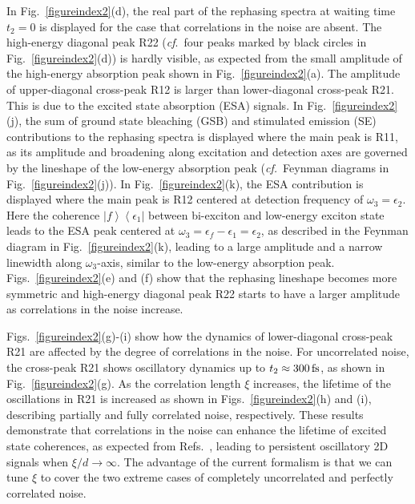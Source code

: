 \documentclass[%
 reprint,%
 amssymb, amsmath,%
 aip,cha,%
]{revtex4-1}
\newcommand{\bra}[1]{\ensuremath{\left\langle{#1}\right\vert}}
\newcommand{\ket}[1]{\ensuremath{\left|{#1}\right\rangle}}
\begin{document}
In Fig.~\ref{figureindex2}(d), the real part of the rephasing spectra at waiting time $t_2=0$ is displayed for the case that correlations in the noise are absent. The high-energy diagonal peak R22 ({\it cf}.~four peaks marked by black circles in Fig.~\ref{figureindex2}(d)) is hardly visible, as expected from the small amplitude of the high-energy absorption peak shown in Fig.~\ref{figureindex2}(a). The amplitude of upper-diagonal cross-peak R12 is larger than lower-diagonal cross-peak R21. This is due to the excited state absorption (ESA) signals. In Fig.~\ref{figureindex2}(j), the sum of ground state bleaching (GSB) and stimulated emission (SE) contributions to the rephasing spectra is displayed where the main peak is R11, as its amplitude and broadening along excitation and detection axes are governed by the lineshape of the low-energy absorption peak ({\it cf.}~Feynman diagrams in Fig.~\ref{figureindex2}(j)). In Fig.~\ref{figureindex2}(k), the ESA contribution is displayed where the main peak is R12 centered at detection frequency of $\omega_3=\epsilon_2$. Here the coherence $\ket{f}\bra{\epsilon_1}$ between bi-exciton and low-energy exciton state leads to the ESA peak centered at $\omega_3=\epsilon_f-\epsilon_1=\epsilon_2$, as described in the Feynman diagram in Fig.~\ref{figureindex2}(k), leading to a large amplitude and a narrow linewidth along $\omega_3$-axis, similar to the low-energy absorption peak. Figs.~\ref{figureindex2}(e) and (f) show that the rephasing lineshape becomes more symmetric and high-energy diagonal peak R22 starts to have a larger amplitude as correlations in the noise increase.

Figs.~\ref{figureindex2}(g)-(i) show how the dynamics of lower-diagonal cross-peak R21 are affected by the degree of correlations in the noise. For uncorrelated noise, the cross-peak R21 shows oscillatory dynamics up to $t_2\approx 300\,{\rm fs}$, as shown in Fig.~\ref{figureindex2}(g). As the correlation length $\xi$ increases, the lifetime of the oscillations in R21 is increased as shown in Figs.~\ref{figureindex2}(h) and (i), describing partially and fully correlated noise, respectively. These results demonstrate that correlations in the noise can enhance the lifetime of excited state coherences, as expected from Refs.~, leading to persistent oscillatory 2D signals when $\xi/d \rightarrow \infty$. The advantage of the current formalism is that we can tune $\xi$ to cover the two extreme cases of completely uncorrelated and perfectly correlated noise.
\end{document}
